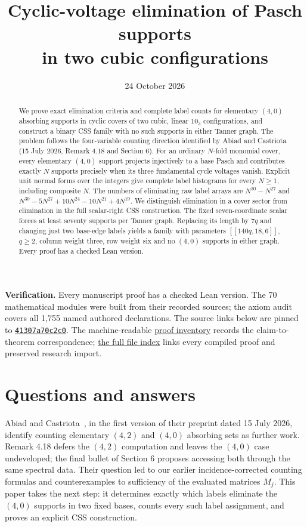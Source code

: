 \documentclass[11pt]{article}
\title{Cyclic-voltage elimination of Pasch supports\\in two cubic configurations}
\author{}
\date{24 October 2026}
\begin{document}
\maketitle
\begin{abstract}
We prove exact elimination criteria and complete label counts for elementary
$(4,0)$ absorbing supports in cyclic covers of two cubic, linear $10_3$
configurations, and construct a binary CSS family with no such supports in
either Tanner graph. The problem follows the four-variable counting direction
identified by Abiad and Castriota (15 July 2026, Remark 4.18 and Section 6).
For an ordinary $N$-fold monomial cover,
every elementary $(4,0)$ support projects injectively to a base Pasch and
contributes exactly $N$ supports precisely when its three fundamental cycle
voltages vanish. Explicit unit normal forms over the integers give complete
label histograms for every $N\geq1$, including composite $N$. The numbers of
eliminating raw label arrays are $N^{30}-N^{27}$ and
$N^{30}-5N^{27}+10N^{24}-10N^{21}+4N^{19}$.
We distinguish elimination in a cover sector from elimination in the full
scalar-right CSS construction. The fixed seven-coordinate scalar forces at
least seventy supports per Tanner graph. Replacing its length by $7q$ and
changing just two base-edge labels yields a family with parameters
$[[140q,18,6]]$, $q\geq2$, column weight three, row weight six and no
$(4,0)$ supports in either graph. Every proof has a checked Lean version.
\end{abstract}
\noindent\textbf{Verification.} Every manuscript proof has a checked Lean version. The 70 mathematical modules were built from their recorded sources; the axiom audit covers all 1,755 named authored declarations. The source links below are pinned to \href{https://github.com/alectionary/vibe-math/commit/41307a70c2c0952e2222ee20ae4517a9b046030f}{\texttt{41307a70c2c0}}. The machine-readable \href{https://github.com/alectionary/vibe-math/blob/41307a70c2c0952e2222ee20ae4517a9b046030f/formalization/lift-label-elimination/proof-coverage.json}{proof inventory} records the claim-to-theorem correspondence; \href{https://github.com/alectionary/vibe-math/blob/41307a70c2c0952e2222ee20ae4517a9b046030f/formalization/lift-label-elimination/PROOFS.md}{the full file index} links every compiled proof and preserved research import.

\section{Questions and answers}
Abiad and Castriota~\cite{AC}, in the first version of their preprint dated
15 July 2026, identify counting elementary $(4,2)$ and $(4,0)$ absorbing sets
as further work. Remark 4.18 defers the $(4,2)$ computation and leaves the
$(4,0)$ case undeveloped; the final bullet of Section 6 proposes accessing
both through the same spectral data. Their question led to our earlier
incidence-corrected counting formulas and counterexamples to sufficiency of
the evaluated matrices $M_j$. This paper takes the next step: it determines
exactly which labels eliminate the $(4,0)$ supports in two fixed bases,
counts every such label assignment, and proves an explicit CSS construction.
\end{document}
